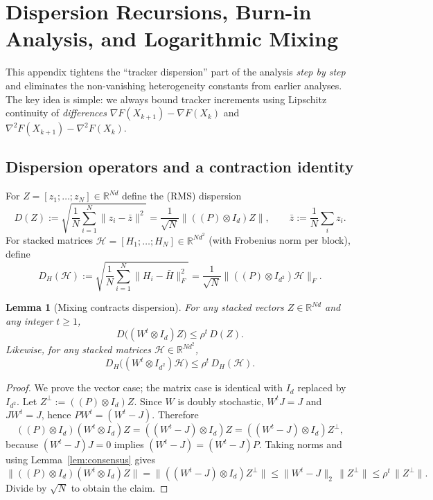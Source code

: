 \documentclass[11pt,a4paper]{article}
\def\one{1}%
\def\J{J}%
\def\Pmat{P}%
\newtheorem{lemma}[theorem]{Lemma}
\newcommand{\R}{\mathbb{R}}
\newcommand{\one}{\mathbf{1}}
\newcommand{\J}{\left(\frac{1}{N}\one\one^\top\right)}
\newcommand{\Pmat}{I-\J}
\begin{document}
\appendix
	
\section{Dispersion Recursions, Burn-in Analysis, and Logarithmic Mixing}\label{app:dispersion}

This appendix tightens the ``tracker dispersion'' part of the analysis \emph{step by step} and eliminates the
non-vanishing heterogeneity constants from earlier analyses. The key idea is simple:
we always bound tracker increments using Lipschitz continuity of \emph{differences}
$\nabla F(X_{k+1})-\nabla F(X_k)$ and $\nabla^2F(X_{k+1})-\nabla^2F(X_k)$.

\subsection{Dispersion operators and a contraction identity}

For $Z=[z_1;\dots;z_N]\in\R^{Nd}$ define the (RMS) dispersion
\[
D(Z):=\sqrt{\frac1N\sum_{i=1}^N\|z_i-\bar z\|^2}
=\frac{1}{\sqrt N}\big\|((\Pmat)\otimes I_d)Z\big\|,
\qquad \bar z:=\frac1N\sum_i z_i.
\]
For stacked matrices $\mathcal H=[H_1;\dots;H_N]\in\R^{Nd^2}$ (with Frobenius norm per block),
define
\[
D_H(\mathcal H):=\sqrt{\frac1N\sum_{i=1}^N\|H_i-\bar H\|_F^2}
=\frac{1}{\sqrt N}\big\|((\Pmat)\otimes I_{d^2})\mathcal H\big\|_F.
\]

\begin{lemma}[Mixing contracts dispersion]\label{lem:mix_contract}
For any stacked vectors $Z\in\R^{Nd}$ and any integer $t\ge1$,
\[
D\big((W^t\otimes I_d)Z\big)\le \rho^t\,D(Z).
\]
Likewise, for any stacked matrices $\mathcal H\in\R^{Nd^2}$,
\[
D_H\big((W^t\otimes I_{d^2})\mathcal H\big)\le \rho^t\,D_H(\mathcal H).
\]
\end{lemma}
\begin{proof}
We prove the vector case; the matrix case is identical with $I_d$ replaced by $I_{d^2}$.
Let $Z^\perp:=((\Pmat)\otimes I_d)Z$. Since $W$ is doubly stochastic, $W^t\J=\J$ and $\J W^t=\J$, hence
$\Pmat W^t=(W^t-\J)$. Therefore
\[
((\Pmat)\otimes I_d)(W^t\otimes I_d)Z=((W^t-\J)\otimes I_d)Z=((W^t-\J)\otimes I_d)Z^\perp,
\]
because $(W^t-\J)\J=0$ implies $(W^t-\J)=(W^t-\J)\Pmat$.
Taking norms and using Lemma~\ref{lem:consensus} gives
\[
\|((\Pmat)\otimes I_d)(W^t\otimes I_d)Z\|
=\|((W^t-\J)\otimes I_d)Z^\perp\|
\le \|W^t-\J\|_2\,\|Z^\perp\|
\le \rho^t\,\|Z^\perp\|.
\]
Divide by $\sqrt N$ to obtain the claim.
\end{proof}
\end{document}
